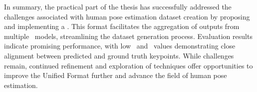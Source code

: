 In summary, the practical part of the thesis has successfully addressed the challenges associated with human pose estimation dataset creation by proposing and implementing a . This format facilitates the aggregation of outputs from multiple \NN\ models, streamlining the dataset generation process. Evaluation results indicate promising performance, with low \APE\ and \MSE\ values demonstrating close alignment between predicted and ground truth keypoints. While challenges remain, continued refinement and exploration of techniques offer opportunities to improve the Unified Format further and advance the field of human pose estimation.